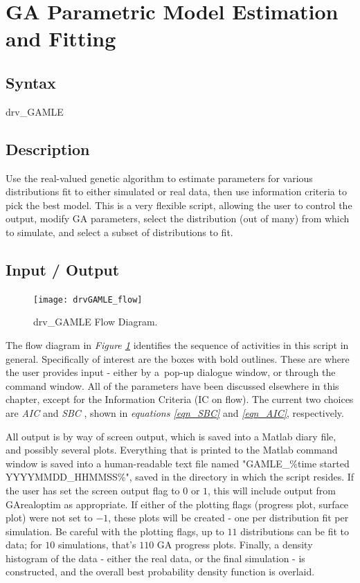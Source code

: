 \documentclass{book}
\newcommand{\textcode}[1]{\textsf{\small #1}}   %
\begin{document}
\section{GA Parametric Model Estimation and Fitting}

\subsection*{Syntax}

\textcode{drv\_GAMLE}

\subsection*{Description}

Use the real-valued genetic algorithm to estimate parameters for various
distributions fit to either simulated or real data, then use information
criteria to pick the best model. This is a very flexible script, allowing
the user to control the output, modify GA parameters, select the
distribution (out of many) from which to simulate, and select a subset of
distributions to fit.

\subsection*{Input / Output}

\begin{figure}[htbp]
\begin{center}
\texttt{[image: drvGAMLE\_flow]}
\end{center}
\caption{\textcode{drv\_GAMLE} Flow Diagram.}
\label{fig_flow}
\end{figure}
The flow diagram in \emph{Figure \ref{fig_flow}} identifies the sequence of
activities in this script in general. Specifically of interest are the boxes
with bold outlines. These are where the user provides input - either by a\
pop-up dialogue window, or through the command window. All of the parameters
have been discussed elsewhere in this chapter, except for the Information
Criteria (IC on flow). The current two choices are \emph{AIC} and \emph{SBC}%
, shown in \emph{equations \ref{eqn_SBC}} and \emph{\ref{eqn_AIC}},
respectively.

All output is by way of screen output, which is saved into a
Matlab diary file, and possibly several plots. Everything that
is printed to the Matlab command window is saved into a
human-readable text file named "GAMLE\_\%time started
YYYYMMDD\_HHMMSS\%", saved in the directory in which the script
resides. If the user has set the screen output flag to $0$ or
$1$, this will include output from \textcode{GArealoptim} as
appropriate. If either of the plotting flags (progress plot,
surface plot) were not set to $-1$, these plots will be created
- one per distribution fit per simulation. Be careful
with the plotting flags, up to $11$ distributions can be fit to data; for $%
10 $ simulations, that's $110$ GA progress plots. Finally, a density
histogram of the data - either the real data, or the final simulation - is
constructed, and the overall best probability density function is overlaid.
\end{document}
